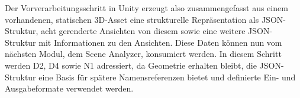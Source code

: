 Der Vorverarbeitungsschritt in Unity erzeugt also zusammengefasst aus einem vorhandenen, statischen 3D-Asset eine strukturelle Repräsentation als JSON-Struktur, acht gerenderte Ansichten von diesem sowie eine weitere JSON-Struktur mit Informationen zu den Ansichten.
Diese Daten können nun vom nächsten Modul, dem Scene Analyzer, konsumiert werden.
In diesem Schritt werden D2, D4 sowie N1 adressiert, da Geometrie erhalten bleibt, die JSON-Struktur eine Basis für spätere Namensreferenzen bietet und definierte Ein- und Ausgabeformate verwendet werden.





